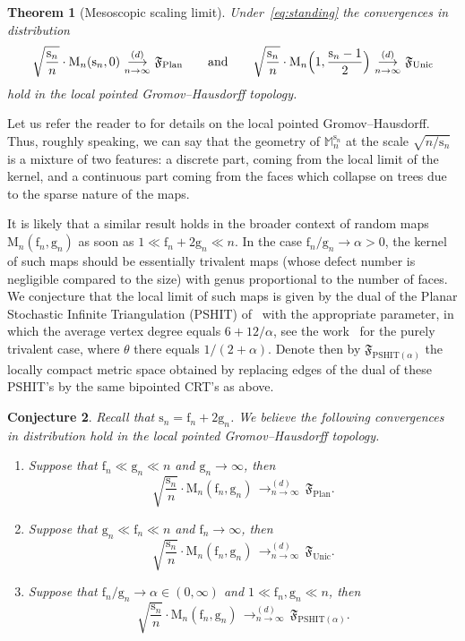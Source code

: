 \documentclass[10pt]{amsart}
\theoremstyle{plain}
\newtheorem{theorem}{Theorem}
\newtheorem{conjecture}[theorem]{Conjecture}
\theoremstyle{definition}
\theoremstyle{remark}
\newcommand{\Map}{\mathrm{M}}
\newcommand{\Mapb}{\mathbb{M}}
\newcommand{\face}{\mathrm{f}}
\newcommand{\gen}{\mathrm{g}}
\newcommand{\spar}{\mathrm{s}}
\newcommand{\cvloi}[1][n]{\,\mathop{\longrightarrow}^{(d)}_{#1 \to \infty}\,}
\begin{document}
\begin{theorem}[Mesoscopic scaling limit]
\label{thm:intermediate}
Under~\eqref{eq:standing} the convergences in distribution
\[
\sqrt{ \frac{\spar_{n}}{n}} \cdot \Map_{n}(\spar_{n},0) \cvloi \mathfrak{F}_{ \mathrm{Plan}}
\qquad \text{and} \qquad
\sqrt{ \frac{\spar_{n}}{n}} \cdot \Map_{n}\Bigl(1,\frac{\spar_{n}-1}{2} \Bigr) \cvloi \mathfrak{F}_{ \mathrm{Unic}}
\]
hold in the local pointed Gromov--Hausdorff topology.
\end{theorem}


Let us refer the reader to \eg \cite{BBI01,CLG14,BMR19} for details on the local pointed Gromov--Hausdorff. Thus, roughly speaking, we can say that the geometry of $ \Mapb_n^{\spar_n}$ at the scale $ \sqrt{n/\spar_n}$ is a mixture of two features: a discrete part, coming from the local limit of the kernel, and a continuous part coming from the faces which collapse on trees due to the sparse nature of the maps.

It is likely that a similar result holds in the broader context of random maps $\Map_n(\face_n, \gen_n)$ as soon as
$1 \ll \face_n+2 \gen_n \ll n$.
In the case $\face_n/\gen_n \rightarrow \alpha>0$, the kernel of such maps should be essentially trivalent maps (\ie whose defect number is negligible compared to the size) with genus proportional to the number of faces. We conjecture that the local limit of such maps is given by the dual of the Planar Stochastic Infinite Triangulation (PSHIT) of~\cite{Cur16} with the appropriate parameter, in which the average vertex degree equals $6+12/\alpha$, see the work~\cite{BL21} for the purely trivalent case, where $\theta$ there equals $1/(2+\alpha)$. Denote then by $\mathfrak{F}_{ \mathrm{PSHIT}(\alpha)}$ the locally compact metric space obtained by replacing edges of the dual of these PSHIT's by the same bipointed CRT's as above.

\begin{conjecture}\label{conjecture:general_thm}
Recall that $\spar_{n} = \face_n+2 \gen_n$.
We believe the following convergences in distribution hold in the local pointed Gromov--Hausdorff topology.
\begin{enumerate}
\item Suppose that $\face_n \ll \gen_n \ll n$ and $\gen_n \to \infty$, then
\[
\sqrt{ \frac{\spar_{n}}{n}} \cdot \Map_{n}(\face_n, \gen_n) \cvloi \mathfrak{F}_{ \mathrm{Plan}}.
\]

\item Suppose that $\gen_n \ll \face_n \ll n$ and $\face_n \to \infty$, then
\[
\sqrt{ \frac{\spar_{n}}{n}} \cdot \Map_{n}(\face_n, \gen_n) \cvloi \mathfrak{F}_{ \mathrm{Unic}}.
\]

\item Suppose that $\face_n/\gen_n \rightarrow \alpha \in (0,\infty)$ and $1 \ll \face_n,\gen_n \ll n$, then
\[
\sqrt{ \frac{\spar_{n}}{n}} \cdot \Map_{n}(\face_n, \gen_n) \cvloi \mathfrak{F}_{ \mathrm{PSHIT}(\alpha)}.
\]
\end{enumerate}
\end{conjecture}
\end{document}
